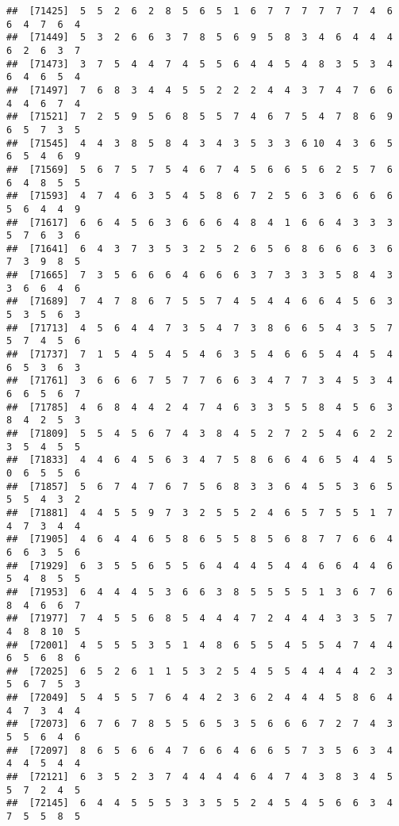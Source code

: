 \documentclass[
]{book}
\begin{document}
\begin{verbatim}
##  [71425]  5  5  2  6  2  8  5  6  5  1  6  7  7  7  7  7  7  4  6  6  4  7  6  4
##  [71449]  5  3  2  6  6  3  7  8  5  6  9  5  8  3  4  6  4  4  4  6  2  6  3  7
##  [71473]  3  7  5  4  4  7  4  5  5  6  4  4  5  4  8  3  5  3  4  6  4  6  5  4
##  [71497]  7  6  8  3  4  4  5  5  2  2  2  4  4  3  7  4  7  6  6  4  4  6  7  4
##  [71521]  7  2  5  9  5  6  8  5  5  7  4  6  7  5  4  7  8  6  9  6  5  7  3  5
##  [71545]  4  4  3  8  5  8  4  3  4  3  5  3  3  6 10  4  3  6  5  6  5  4  6  9
##  [71569]  5  6  7  5  7  5  4  6  7  4  5  6  6  5  6  2  5  7  6  6  4  8  5  5
##  [71593]  4  7  4  6  3  5  4  5  8  6  7  2  5  6  3  6  6  6  6  5  6  4  4  9
##  [71617]  6  6  4  5  6  3  6  6  6  4  8  4  1  6  6  4  3  3  3  5  7  6  3  6
##  [71641]  6  4  3  7  3  5  3  2  5  2  6  5  6  8  6  6  6  3  6  7  3  9  8  5
##  [71665]  7  3  5  6  6  6  4  6  6  6  3  7  3  3  3  5  8  4  3  3  6  6  4  6
##  [71689]  7  4  7  8  6  7  5  5  7  4  5  4  4  6  6  4  5  6  3  5  3  5  6  3
##  [71713]  4  5  6  4  4  7  3  5  4  7  3  8  6  6  5  4  3  5  7  5  7  4  5  6
##  [71737]  7  1  5  4  5  4  5  4  6  3  5  4  6  6  5  4  4  5  4  6  5  3  6  3
##  [71761]  3  6  6  6  7  5  7  7  6  6  3  4  7  7  3  4  5  3  4  6  6  5  6  7
##  [71785]  4  6  8  4  4  2  4  7  4  6  3  3  5  5  8  4  5  6  3  8  4  2  5  3
##  [71809]  5  5  4  5  6  7  4  3  8  4  5  2  7  2  5  4  6  2  2  3  5  4  5  5
##  [71833]  4  4  6  4  5  6  3  4  7  5  8  6  6  4  6  5  4  4  5  0  6  5  5  6
##  [71857]  5  6  7  4  7  6  7  5  6  8  3  3  6  4  5  5  3  6  5  5  5  4  3  2
##  [71881]  4  4  5  5  9  7  3  2  5  5  2  4  6  5  7  5  5  1  7  4  7  3  4  4
##  [71905]  4  6  4  4  6  5  8  6  5  5  8  5  6  8  7  7  6  6  4  6  6  3  5  6
##  [71929]  6  3  5  5  6  5  5  6  4  4  4  5  4  4  6  6  4  4  6  5  4  8  5  5
##  [71953]  6  4  4  4  5  3  6  6  3  8  5  5  5  5  1  3  6  7  6  8  4  6  6  7
##  [71977]  7  4  5  5  6  8  5  4  4  4  7  2  4  4  4  3  3  5  7  4  8  8 10  5
##  [72001]  4  5  5  5  3  5  1  4  8  6  5  5  4  5  5  4  7  4  4  6  5  6  8  6
##  [72025]  6  5  2  6  1  1  5  3  2  5  4  5  5  4  4  4  4  2  3  5  6  7  5  3
##  [72049]  5  4  5  5  7  6  4  4  2  3  6  2  4  4  4  5  8  6  4  4  7  3  4  4
##  [72073]  6  7  6  7  8  5  5  6  5  3  5  6  6  6  7  2  7  4  3  5  5  6  4  6
##  [72097]  8  6  5  6  6  4  7  6  6  4  6  6  5  7  3  5  6  3  4  4  4  5  4  4
##  [72121]  6  3  5  2  3  7  4  4  4  4  6  4  7  4  3  8  3  4  5  5  7  2  4  5
##  [72145]  6  4  4  5  5  5  3  3  5  5  2  4  5  4  5  6  6  3  4  7  5  5  8  5

\end{verbatim}
\end{document}
